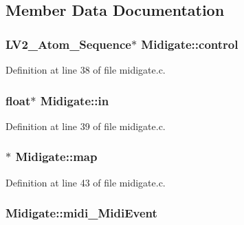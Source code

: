 \subsection{Member Data Documentation}
\subsubsection[{\texorpdfstring{control}{control}}]{ {\bf L\+V2\+\_\+\+Atom\+\_\+\+Sequence}$\ast$ Midigate\+::control}\hypertarget{struct_midigate_a35c654d5e8e01aad7dbce9d88e6d51ea}{}\label{struct_midigate_a35c654d5e8e01aad7dbce9d88e6d51ea}


Definition at line 38 of file midigate.\+c.

\subsubsection[{\texorpdfstring{in}{in}}]{ float$\ast$ Midigate\+::in}\hypertarget{struct_midigate_a4f074dfde3d9b0be324745fccca29590}{}\label{struct_midigate_a4f074dfde3d9b0be324745fccca29590}


Definition at line 39 of file midigate.\+c.

\subsubsection[{\texorpdfstring{map}{map}}]{$\ast$ Midigate\+::map}\hypertarget{struct_midigate_ad84aafd7d3c3b34d267dfb68c36586bd}{}\label{struct_midigate_ad84aafd7d3c3b34d267dfb68c36586bd}


Definition at line 43 of file midigate.\+c.

\subsubsection[{\texorpdfstring{midi\+\_\+\+Midi\+Event}{midi_MidiEvent}}]{ Midigate\+::midi\+\_\+\+Midi\+Event}\hypertarget{struct_midigate_a6d1fa95568c053c1c8ddb9a80683fbdf}{}\label{struct_midigate_a6d1fa95568c053c1c8ddb9a80683fbdf}


